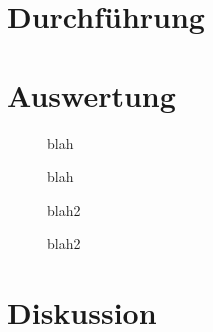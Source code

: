 \documentclass[twoside,        %
               BCOR12mm,       %
               english,ngerman, %
               fleqn,headsepline=false,footsepline=false
              ]{Vorlage/MFPREPORT}
\begin{document}
\section{Durchführung}

\label{sec:durchfuehrung}
\section{Auswertung}
\label{sec:auswertung}

\begin{figure}[]
    \centering
    
    \caption{blah}
    \label{fig:temp1}
\end{figure}
\begin{figure}[]
    \centering
    
    \caption{blah}
    \label{fig:spec1}
\end{figure}
\begin{figure}[]
    \centering
    
    \caption{blah2}
    \label{fig:temp2}
\end{figure}
\begin{figure}[]
    \centering
    
    \caption{blah2}
    \label{fig:spec2}
\end{figure}
\section{Diskussion}
\end{document}
